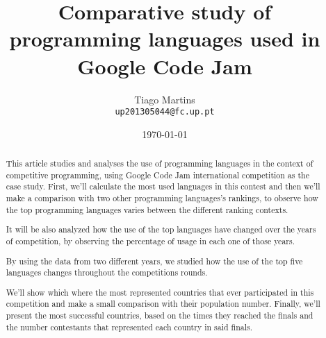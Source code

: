 \documentclass{article}
\begin{document}
\title{Comparative study of programming languages used in Google Code Jam}

\author{Tiago Martins\\ \texttt{up201305044@fc.up.pt} \\
}

\date{\today}

\maketitle


\begin{abstract}

This article studies and analyses the use of programming languages in the context of competitive programming, using Google Code Jam international competition as the case study. First, we'll calculate the most used languages in this contest and then we'll make a comparison with two other programming languages's rankings, to observe how the top programming languages varies between the different ranking contexts.

It will be also analyzed how the use of the top languages have changed over the years of competition, by observing the percentage of usage in each one of those years.

By using the data from two different years, we studied how the use of the top five languages changes throughout the competitions rounds.

We'll show which where the most represented countries that ever participated in this competition and make a small comparison with their population number. Finally, we'll present the most successful countries, based on the times they reached the finals and the number contestants that represented each country in said finals.


\vspace{5mm}
\end{abstract}

\end{document}
